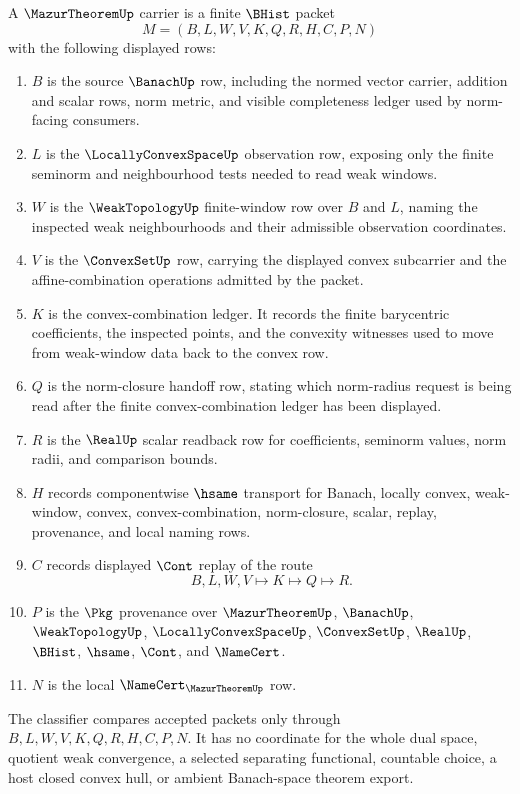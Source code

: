 \begin{definition}
\label{def:mazur-theorem-carrier}
A $\MazurTheoremUp$ carrier is a finite $\BHist$ packet
$$
M=(B,L,W,V,K,Q,R,H,C,P,N)
$$
with the following displayed rows:
\begin{enumerate}
\item $B$ is the source $\BanachUp$ row, including the normed vector carrier, addition and scalar rows, norm metric, and visible completeness ledger used by norm-facing consumers.
\item $L$ is the $\LocallyConvexSpaceUp$ observation row, exposing only the finite seminorm and neighbourhood tests needed to read weak windows.
\item $W$ is the $\WeakTopologyUp$ finite-window row over $B$ and $L$, naming the inspected weak neighbourhoods and their admissible observation coordinates.
\item $V$ is the $\ConvexSetUp$ row, carrying the displayed convex subcarrier and the affine-combination operations admitted by the packet.
\item $K$ is the convex-combination ledger. It records the finite barycentric coefficients, the inspected points, and the convexity witnesses used to move from weak-window data back to the convex row.
\item $Q$ is the norm-closure handoff row, stating which norm-radius request is being read after the finite convex-combination ledger has been displayed.
\item $R$ is the $\RealUp$ scalar readback row for coefficients, seminorm values, norm radii, and comparison bounds.
\item $H$ records componentwise $\hsame$ transport for Banach, locally convex, weak-window, convex, convex-combination, norm-closure, scalar, replay, provenance, and local naming rows.
\item $C$ records displayed $\Cont$ replay of the route
$$
B,L,W,V \longmapsto K \longmapsto Q \longmapsto R .
$$
\item $P$ is the $\Pkg$ provenance over $\MazurTheoremUp$, $\BanachUp$, $\WeakTopologyUp$, $\LocallyConvexSpaceUp$, $\ConvexSetUp$, $\RealUp$, $\BHist$, $\hsame$, $\Cont$, and $\NameCert$.
\item $N$ is the local $\NameCert_{\MazurTheoremUp}$ row.
\end{enumerate}
The classifier compares accepted packets only through $B,L,W,V,K,Q,R,H,C,P,N$. It has no coordinate for the whole dual space, quotient weak convergence, a selected separating functional, countable choice, a host closed convex hull, or ambient Banach-space theorem export.
\end{definition}

